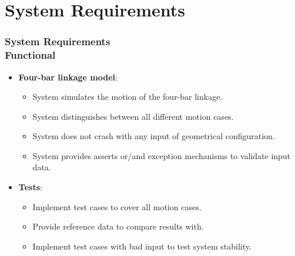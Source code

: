 \documentclass[ucs,10pt]{beamer}
\begin{document}
\section{System Requirements}

\begin{frame}
\frametitle{System Requirements \\
    \small \color{rwth-blue} Functional}
    \begin{itemize}
        \item \textbf{Four-bar linkage model}:
        \begin{itemize}
            \item System simulates the motion of the four-bar linkage.
            \item System distinguishes between all different motion cases.
            \item System does not crash with any input of geometrical configuration.
            \item System provides asserts or/and exception mechanisms to validate input data.
        \end{itemize}
        \item \textbf{Tests}:
        \begin{itemize}
            \item Implement test cases to cover all motion cases.
            \item Provide reference data to compare results with.
            \item Implement test cases with bad input to test system stability.
        \end{itemize}
    \end{itemize}
\end{frame}
\end{document}

